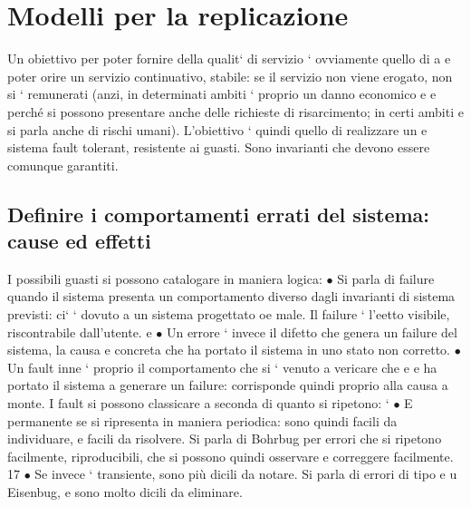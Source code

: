 \documentclass[a4paper,12pt]{article}
\begin{document}
\section{Modelli per la replicazione}
Un obiettivo per poter fornire della qualit` di servizio ` ovviamente quello di
a
e
poter orire un servizio continuativo, stabile: se il servizio non viene erogato,
non si ` remunerati (anzi, in determinati ambiti ` proprio un danno economico
e
e
perché si possono presentare anche delle richieste di risarcimento; in certi ambiti
e
si parla anche di rischi umani). L'obiettivo ` quindi quello di realizzare un
e
sistema fault tolerant, resistente ai guasti. Sono invarianti che devono essere
comunque garantiti.
\subsection{Definire i comportamenti errati del sistema: cause ed effetti}
I possibili guasti si possono catalogare in maniera logica:
$\bullet$ Si parla di failure quando il sistema presenta un comportamento diverso
dagli invarianti di sistema previsti: ci` ` dovuto a un sistema progettato
oe
male. Il failure ` l'eetto visibile, riscontrabile dall'utente.
e
$\bullet$ Un errore ` invece il difetto che genera un failure del sistema, la causa
e
concreta che ha portato il sistema in uno stato non corretto.
$\bullet$ Un fault inne ` proprio il comportamento che si ` venuto a vericare che
e
e
ha portato il sistema a generare un failure: corrisponde quindi proprio alla
causa a monte.
I fault si possono classicare a seconda di quanto si ripetono:
`
$\bullet$ E permanente se si ripresenta in maniera periodica: sono quindi facili
da individuare, e facili da risolvere. Si parla di Bohrbug per errori che
si ripetono facilmente, riproducibili, che si possono quindi osservare e
correggere facilmente.
17
$\bullet$ Se invece ` transiente, sono più dicili da notare. Si parla di errori di tipo
e
u
Eisenbug, e sono molto dicili da eliminare.
\end{document}
